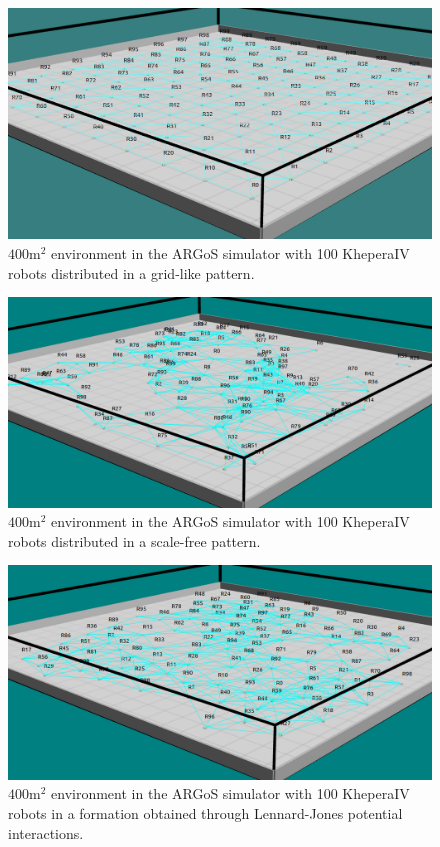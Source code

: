 \documentclass[sigconf]{aamas}
\begin{document}
\begin{figure}[h]
	\centering
    \includegraphics[width=0.90\columnwidth]{figures/argos_grid_link.png}
    \caption{$400 \text{m}^2$ environment in the ARGoS simulator with 100 KheperaIV robots distributed in a grid-like pattern.}
    \label{argos}
\end{figure}

\begin{figure}[h]
	\centering
    \includegraphics[width=0.90\columnwidth]{figures/argos_scale_free.png}
    \caption{$400 \text{m}^2$ environment in the ARGoS simulator with 100 KheperaIV robots distributed in a scale-free pattern.}
    \label{argos}
\end{figure}

\begin{figure}[h]
	\centering
    \includegraphics[width=0.90\columnwidth]{figures/argos_lennard.png}
    \caption{$400 \text{m}^2$ environment in the ARGoS simulator with 100 KheperaIV robots in a formation obtained through Lennard-Jones potential interactions.}
    \label{argos}
\end{figure}
\end{document}
